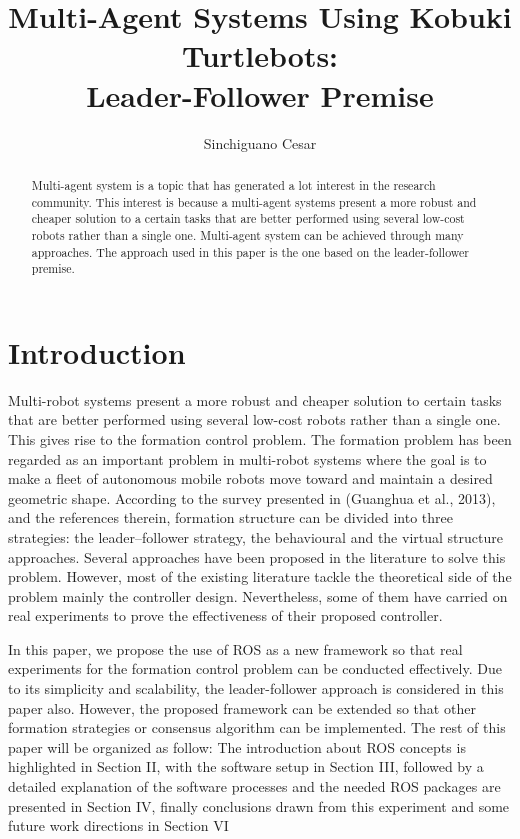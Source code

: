 \documentclass[journal]{IEEEtran}
\begin{document}
%
\title{Multi-Agent Systems Using Kobuki Turtlebots:\\Leader-Follower Premise}
\author{Sinchiguano Cesar}


\maketitle

\begin{abstract}

Multi-agent system is a topic that has generated a lot interest in the research community. This interest is because a multi-agent systems present a more robust and cheaper solution to a certain tasks that are better performed using several low-cost robots rather than a single one. Multi-agent system can be achieved through many approaches. The approach used in this paper is the one based on the leader-follower premise.
\end{abstract}


\section{Introduction}


Multi-robot systems present a more robust and cheaper solution to certain tasks that are better performed using several low-cost robots rather than a single one. This gives rise to the formation control problem. The formation problem has been regarded as an important problem in multi-robot systems where the goal is to make a fleet of autonomous mobile robots move toward and maintain a desired geometric shape. According to the survey presented in (Guanghua et al., 2013), and the references therein, formation structure can be divided into three strategies: the leader–follower strategy, the behavioural and the virtual structure approaches. Several approaches have been proposed in the literature to solve this problem. However, most of the existing literature tackle the theoretical side of the problem mainly the controller design. Nevertheless, some of them have carried on real experiments to prove the effectiveness of their proposed controller. 

In this paper, we propose the use of ROS as a new framework so that real experiments for the formation control problem can be conducted effectively. Due to its simplicity and scalability, the leader-follower approach is considered in this paper also. However, the proposed framework can be extended so that other formation strategies or consensus algorithm can be implemented. 
The rest of this paper will be organized as follow: The introduction about ROS concepts is highlighted in Section II, with the software setup in Section III, followed by a detailed explanation of the software processes and the needed ROS packages are presented  in Section IV, finally conclusions drawn from this experiment and some future work directions in Section VI
\end{document}
